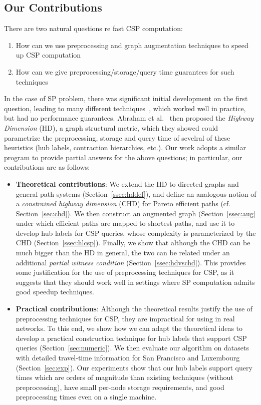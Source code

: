 \subsection{Our Contributions}

\noindent There are two natural questions re fast CSP computation:
\begin{enumerate}[nosep,leftmargin=*]
\item How can we use preprocessing and graph augmentation techniques to speed up CSP computation 
\item How can we give preprocessing/storage/query time guarantees for such techniques
\end{enumerate}

In the case of SP problem, there was significant initial development on the first question, leading to many different techniques~\cite{dimacs09}, which worked well in practice, but had no performance guarantees.
Abraham et al.~\cite{highway2010,highway2013} then proposed the \emph{Highway Dimension} (HD), a graph structural metric, which they showed could parametrize the preprocessing, storage and query time of sevelral of these heuristics (hub labels, contraction hierarchies, etc.).
Our work adopts a similar program to provide partial answers for the above questions; in particular, our contributions are as follows:
\begin{itemize}[nosep,leftmargin=*]
\item \textbf{Theoretical contributions}: 
We extend the HD to directed graphs and general path systems (Section~\ref{ssec:hddef}), and define an analogous notion of a \emph{constrained highway dimension} (CHD) for Pareto efficient paths (cf. Section~\ref{sec:chd}). We then construct an augmented graph (Section~\ref{ssec:aug} under which efficient paths are mapped to shortest paths, and use it to develop hub labels for CSP queries, whose complexity is parameterized by the CHD (Section~\ref{ssec:hlcsp}).
Finally, we show that although the CHD can be much bigger than the HD in general, the two can be related under an additional \emph{partial witness condition} (Section~\ref{ssec:hdvschd}). This provides some justification for the use of preprocessing techniques for CSP, as it suggests that they should work well in settings where SP computation admits good speedup techniques.
\item \textbf{Practical contributions}: Although the theoretical results justify the use of preprocessing techniques for CSP, they are impractical for using in real networks. To this end, we show how we can adapt the theoretical ideas to develop a practical construction technique for hub labels that support CSP queries (Section~\ref{sec:numeric}). We then evaluate our algorithm on datasets with detailed travel-time information for San Francisco and Luxembourg (Section~\ref{sec:exp}). Our experiments show that our hub labels support query times which are orders of magnitude than existing techniques (without preprocessing), have small per-node storage requirements, and good preprocessing times even on a single machine. 
\end{itemize}	

